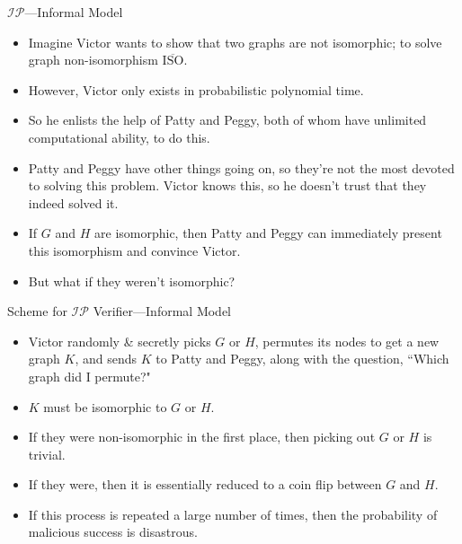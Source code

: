 \begin{frame}{$\mathcal{IP}$---Informal Model}
\begin{itemize}[<+->]
    \item Imagine Victor wants to show that two graphs are not isomorphic; to solve graph non-isomorphism $\overline{\mathrm{ISO}}$.
    \item However, Victor only exists in probabilistic polynomial time.
    \item So he enlists the help of Patty and Peggy, both of whom have unlimited computational ability, to do this.
    \item Patty and Peggy have other things going on, so they're not the most devoted to solving this problem. Victor knows this, so he doesn't trust that they indeed solved it.
    \item If $G$ and $H$ are isomorphic, then Patty and Peggy can immediately present this isomorphism and convince Victor.
    \item But what if they weren't isomorphic?
\end{itemize}
\end{frame}

\begin{frame}{Scheme for $\mathcal{IP}$ Verifier---Informal Model}
    \begin{itemize}[<+->]
        \item Victor randomly \& secretly picks $G$ or $H$, permutes its nodes to get a new graph $K$, and sends $K$ to Patty and Peggy, along with the question, ``Which graph did I permute?"
        \item $K$ must be isomorphic to $G$ or $H$.
        \item If they were non-isomorphic in the first place, then picking out $G$ or $H$ is trivial.
        \item If they were, then it is essentially reduced to a coin flip between $G$ and $H$.
        \item If this process is repeated a large number of times, then the probability of malicious success is disastrous.
    \end{itemize}
\end{frame}

